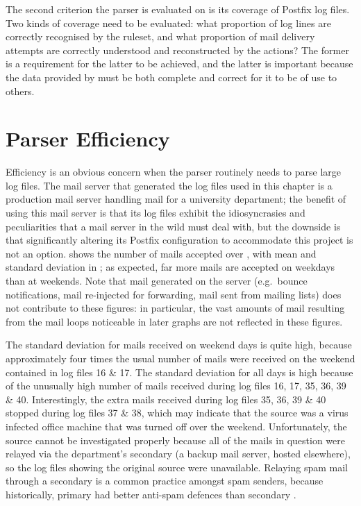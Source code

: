 The second criterion the parser is evaluated on is its coverage of Postfix
log files.  Two kinds of coverage need to be evaluated: what proportion of
log lines are correctly recognised by the ruleset, and what proportion of
mail delivery attempts are correctly understood and reconstructed by the
actions?  The former is a requirement for the latter to be achieved, and
the latter is important because the data provided by \parsername{} must be
both complete and correct for it to be of use to others.

\section{Parser Efficiency}

\label{parser efficiency}

Efficiency is an obvious concern when the parser routinely needs to parse
large log files.  The mail server that generated the \numberOFlogFILES{}
log files used in this chapter is a production mail server handling mail
for a university department; the benefit of using this mail server is that
its log files exhibit the idiosyncrasies and peculiarities that a mail
server in the wild must deal with, but the downside is that significantly
altering its Postfix configuration to accommodate this project is not an
option.   shows the number of mails
accepted over , with mean and standard deviation in
; as expected, far
more mails are accepted on weekdays than at weekends.  Note that mail
generated on the server (e.g.\ bounce notifications, mail re-injected for
forwarding, mail sent from mailing lists) does not contribute to these
figures: in particular, the vast amounts of mail resulting from the mail
loops noticeable in later graphs are not reflected in these figures.

The standard deviation for mails received on weekend days is quite high,
because approximately four times the usual number of mails were received on
the weekend contained in log files 16 \& 17.  The standard deviation for
all days is high because of the unusually high number of mails received
during log files 16, 17, 35, 36, 39 \& 40.  Interestingly, the extra mails
received during log files 35, 36, 39 \& 40 stopped during log files 37 \&
38, which may indicate that the source was a virus infected office machine
that was turned off over the weekend.  Unfortunately, the source cannot be
investigated properly because all of the mails in question were relayed via
the department's secondary  (a backup mail server, hosted
elsewhere), so the log files showing the original source were unavailable.
Relaying spam mail through a secondary  is a common practice
amongst spam senders, because historically, primary  had
better anti-spam defences than secondary .

